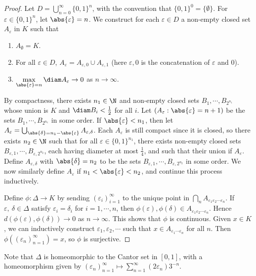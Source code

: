 \documentclass[a4paper]{article}
\begin{document}
\begin{proof}
	Let $D=\bigcup_{n=0}^\infty\{0,1\}^n$, with the convention that $\{0,1\}^0=\{\emptyset\}$. For $\varepsilon\in\{0,1\}^n$, let $\abs{\varepsilon}=n$. We construct for each $\varepsilon\in D$ a non-empty closed set $A_\varepsilon$ in $K$ such that
	\begin{enumerate}[nosep]
		\item $A_\emptyset=K$.
		\item For all $\varepsilon\in D$, $A_\varepsilon=A_{\varepsilon, 0}\cup A_{\varepsilon, 1}$ (here $\varepsilon,0$ is the concatenation of $\varepsilon$ and 0).
		\item $\max_{\abs{\varepsilon}=n}\limits\diam A_\varepsilon\to 0$ as $n\to\infty$.
	\end{enumerate}
	By compactness, there exists $n_1\in\N$ and non-empty closed sets $B_1,\cdots,B_{2^{n_1}}$ whose union is $K$ and $\diam B_i<\frac{1}{2}$ for all $i$. Let $(A_{\varepsilon}:\abs{\varepsilon}=n+1)$ be the sets $B_1,\cdots,B_{2^{n_1}}$ in some order. If $\abs{\varepsilon}<n_1$, then let $A_\varepsilon=\bigcup_{\abs{\delta}=n_1-\abs{\varepsilon}}A_{\varepsilon,\delta}$. Each $A_\varepsilon$ is still compact since it is closed, so there exists $n_2\in\N$ such that for all $\varepsilon\in\{0,1\}^{n_1}$, there exists non-empty closed sets $B_{\varepsilon,1},\cdots,B_{\varepsilon,2^{n_2}}$, each having diameter at most $\frac{1}{4}$, and such that their union if $A_\varepsilon$. Define $A_{\varepsilon,\delta}$ with $\abs{\delta}=n_2$ to be the sets $B_{\varepsilon,1},\cdots,B_{\varepsilon,2^{n_2}}$ in some order. We now similarly define $A_{\varepsilon}$ if $n_1<\abs{\varepsilon}<n_2$, and continue this process inductively.

	Define $\phi:\Delta\to K$ by sending $(\varepsilon_i)_{i=1}^\infty$ to the unique point in $\bigcap_n A_{\varepsilon_1\varepsilon_2\cdots\varepsilon_n}$. If $\varepsilon,\ \delta\in\Delta$ satisfy $\varepsilon_i=\delta_i$ for $i=1,\cdots,n$, then $\phi(\varepsilon),\phi(\delta)\in A_{\varepsilon_1\varepsilon_2\cdots\varepsilon_n}$. Hence $d(\phi(\varepsilon),\phi(\delta))\to 0$ as $n\to\infty$. This shows that $\phi$ is continuous. Given $x\in K$, we can inductively construct $\varepsilon_1,\varepsilon_2,\cdots$ such that $x\in A_{\varepsilon_1\cdots\varepsilon_n}$ for all $n$. Then $\phi((\varepsilon_n)_{n=1}^\infty)=x$, so $\phi$ is surjective.
\end{proof}

\begin{remark}
  Note that $\Delta$ is homeomorphic to the Cantor set in $[0,1]$, with a homeomorphism given by $(\varepsilon_n)_{n=1}^\infty \mapsto\sum_{n=1}^\infty (2\varepsilon_n)3^{-n}$.
\end{remark}
\end{document}
